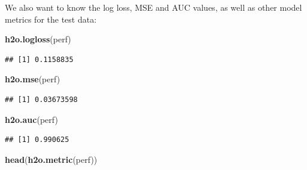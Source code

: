 \documentclass[]{article}
\newenvironment{Shaded}{\begin{snugshade}}{\end{snugshade}}
\newcommand{\KeywordTok}[1]{\textcolor[rgb]{0.13,0.29,0.53}{\textbf{{#1}}}}
\newcommand{\NormalTok}[1]{{#1}}
\begin{document}
We also want to know the log loss, MSE and AUC values, as well as other
model metrics for the test data:

\begin{Shaded}
\begin{Highlighting}[]
\KeywordTok{h2o.logloss}\NormalTok{(perf)}
\end{Highlighting}
\end{Shaded}

\begin{verbatim}
## [1] 0.1158835
\end{verbatim}

\begin{Shaded}
\begin{Highlighting}[]
\KeywordTok{h2o.mse}\NormalTok{(perf)}
\end{Highlighting}
\end{Shaded}

\begin{verbatim}
## [1] 0.03673598
\end{verbatim}

\begin{Shaded}
\begin{Highlighting}[]
\KeywordTok{h2o.auc}\NormalTok{(perf)}
\end{Highlighting}
\end{Shaded}

\begin{verbatim}
## [1] 0.990625
\end{verbatim}

\begin{Shaded}
\begin{Highlighting}[]
\KeywordTok{head}\NormalTok{(}\KeywordTok{h2o.metric}\NormalTok{(perf))}
\end{Highlighting}
\end{Shaded}
\end{document}
